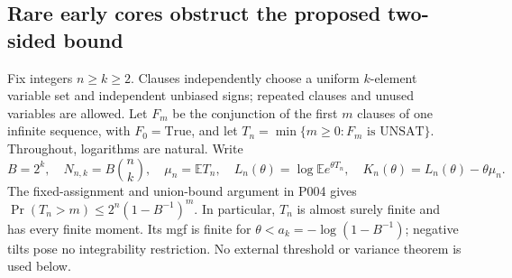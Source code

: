 \subsection{Rare early cores obstruct the proposed two-sided bound}
\label{sec:P005}

Fix integers $n\ge k\ge2$. Clauses independently choose a uniform
$k$-element variable set and independent unbiased signs; repeated clauses
and unused variables are allowed. Let $F_m$ be the conjunction of the
first $m$ clauses of one infinite sequence, with $F_0=\mathrm{True}$, and
let $T_n=\min\{m\ge0:F_m\text{ is UNSAT}\}$. Throughout, logarithms are
natural. Write
\[
 B=2^k,\quad N_{n,k}=B\binom nk,\quad
 \mu_n=\mathbb E T_n,\quad
 L_n(\theta)=\log\mathbb E e^{\theta T_n},\quad
 K_n(\theta)=L_n(\theta)-\theta\mu_n.
\]
The fixed-assignment and union-bound argument in P004 gives
$\Pr(T_n>m)\le2^n(1-B^{-1})^m$. In particular, $T_n$ is almost surely
finite and has every finite moment. Its mgf is finite for
$\theta< a_k=-\log(1-B^{-1})$; negative tilts pose no integrability
restriction. No external threshold or variance theorem is used below.

